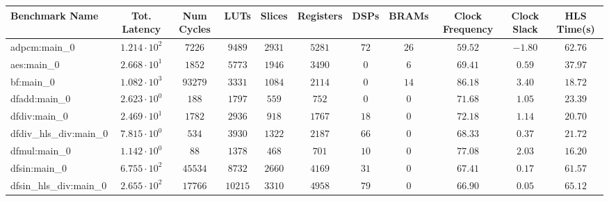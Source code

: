 \begin{tabular}{|l|c|c|c|c|c|c|c|c|c|c|}
\hline
Benchmark Name          & Tot. Latency           & Num Cycles & LUTs      & Slices    & Registers & DSPs    & BRAMs   & Clock Frequency & Clock Slack & HLS Time(s) \\
\hline
adpcm:main\_0           & $ 1.214 \cdot 10^{2} $ & $ 7226   $ & $ 9489  $ & $ 2931  $ & $ 5281  $ & $ 72  $ & $ 26  $ & $ 59.52       $ & $ -1.80   $ & $ 62.76   $ \\
aes:main\_0             & $ 2.668 \cdot 10^{1} $ & $ 1852   $ & $ 5773  $ & $ 1946  $ & $ 3490  $ & $ 0   $ & $ 6   $ & $ 69.41       $ & $ 0.59    $ & $ 37.97   $ \\
bf:main\_0              & $ 1.082 \cdot 10^{3} $ & $ 93279  $ & $ 3331  $ & $ 1084  $ & $ 2114  $ & $ 0   $ & $ 14  $ & $ 86.18       $ & $ 3.40    $ & $ 18.72   $ \\
dfadd:main\_0           & $ 2.623 \cdot 10^{0} $ & $ 188    $ & $ 1797  $ & $ 559   $ & $ 752   $ & $ 0   $ & $ 0   $ & $ 71.68       $ & $ 1.05    $ & $ 23.39   $ \\
dfdiv:main\_0           & $ 2.469 \cdot 10^{1} $ & $ 1782   $ & $ 2936  $ & $ 918   $ & $ 1767  $ & $ 18  $ & $ 0   $ & $ 72.18       $ & $ 1.14    $ & $ 20.70   $ \\
dfdiv\_hls\_div:main\_0 & $ 7.815 \cdot 10^{0} $ & $ 534    $ & $ 3930  $ & $ 1322  $ & $ 2187  $ & $ 66  $ & $ 0   $ & $ 68.33       $ & $ 0.37    $ & $ 21.72   $ \\
dfmul:main\_0           & $ 1.142 \cdot 10^{0} $ & $ 88     $ & $ 1378  $ & $ 468   $ & $ 701   $ & $ 10  $ & $ 0   $ & $ 77.08       $ & $ 2.03    $ & $ 16.20   $ \\
dfsin:main\_0           & $ 6.755 \cdot 10^{2} $ & $ 45534  $ & $ 8732  $ & $ 2660  $ & $ 4169  $ & $ 31  $ & $ 0   $ & $ 67.41       $ & $ 0.17    $ & $ 61.57   $ \\
dfsin\_hls\_div:main\_0 & $ 2.655 \cdot 10^{2} $ & $ 17766  $ & $ 10215 $ & $ 3310  $ & $ 4958  $ & $ 79  $ & $ 0   $ & $ 66.90       $ & $ 0.05    $ & $ 65.12   $ \\

\end{tabular}
